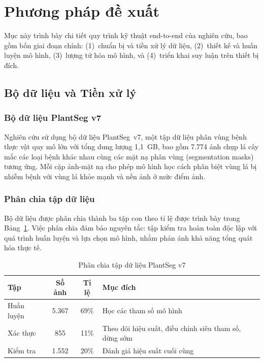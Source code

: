\documentclass[conference]{IEEEtran}
\begin{document}
\section{Phương pháp đề xuất}

Mục này trình bày chi tiết quy trình kỹ thuật end-to-end của nghiên cứu, bao gồm bốn giai đoạn chính: (1)~chuẩn bị và tiền xử lý dữ liệu, (2)~thiết kế và huấn luyện mô hình, (3)~lượng tử hóa mô hình, và (4)~triển khai suy luận trên thiết bị đích.

\subsection{Bộ dữ liệu và Tiền xử lý}

\subsubsection{Bộ dữ liệu PlantSeg v7}

Nghiên cứu sử dụng bộ dữ liệu PlantSeg~v7, một tập dữ liệu phân vùng bệnh thực vật quy mô lớn với tổng dung lượng 1,1~GB, bao gồm 7.774 ảnh chụp lá cây mắc các loại bệnh khác nhau cùng các mặt nạ phân vùng (segmentation masks) tương ứng. Mỗi cặp ảnh-mặt nạ cho phép mô hình học cách phân biệt vùng lá bị nhiễm bệnh với vùng lá khỏe mạnh và nền ảnh ở mức điểm ảnh.

\subsubsection{Phân chia tập dữ liệu}

Bộ dữ liệu được phân chia thành ba tập con theo tỉ lệ được trình bày trong Bảng~\ref{tab:dataset_split}. Việc phân chia đảm bảo nguyên tắc: tập kiểm tra hoàn toàn độc lập với quá trình huấn luyện và lựa chọn mô hình, nhằm phản ánh khả năng tổng quát hóa thực tế.

\begin{table}[htbp]
\centering
\caption{Phân chia tập dữ liệu PlantSeg v7}
\label{tab:dataset_split}
\begin{tabular}{lccp{3.2cm}}
\toprule
\textbf{Tập} & \textbf{Số ảnh} & \textbf{Tỉ lệ} & \textbf{Mục đích} \\
\midrule
Huấn luyện   & 5.367 & 69\% & Học các tham số mô hình \\
Xác thực     & 855   & 11\% & Theo dõi hiệu suất, điều chỉnh siêu tham số, dừng sớm \\
Kiểm tra     & 1.552 & 20\% & Đánh giá hiệu suất cuối cùng \\
\bottomrule
\end{tabular}
\end{table}
\end{document}
